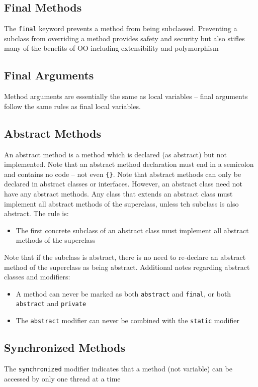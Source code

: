 \subsection{Final Methods}
The \verb#final# keyword prevents a method from being subclassed. Preventing a 
subclass from overriding a method provides safety and security but also stifles 
many of the benefits of OO including extensibility and polymorphism

\subsection{Final Arguments}
Method arguments are essentially the same as local variables -- final arguments 
follow the same rules as final local variables.

\subsection{Abstract Methods}
An abstract method is a method which is declared (as abstract) but not 
implemented. Note that an abstract method declaration must end in a semicolon 
and contains no code -- not even \verb#{}#. Note that abstract methods can only 
be declared in abstract classes or interfaces. However, an abstract class need 
not have any abstract methods. Any class that extends an abstract class must 
implement all abstract methods of the superclass, unless teh subclass is also 
abstract. The rule is:
\begin{itemize}
    \item The first concrete subclass of an abstract class must implement all 
    abstract methods of the superclass
\end{itemize}
Note that if the subclass is abstract, there is no need to re-declare an 
abstract method of the superclass as being abstract. Additional notes regarding 
abstract classes and modifiers:
\begin{itemize}
    \item A method can never be marked as both \verb#abstract# and 
    \verb#final#, or both \verb#abstract# and \verb#private#
    \item The \verb#abstract# modifier can never be combined with the 
    \verb#static# modifier
\end{itemize}

\subsection{Synchronized Methods}
The \verb#synchronized# modifier indicates that a method (not variable) can be 
accessed by only one thread at a time

